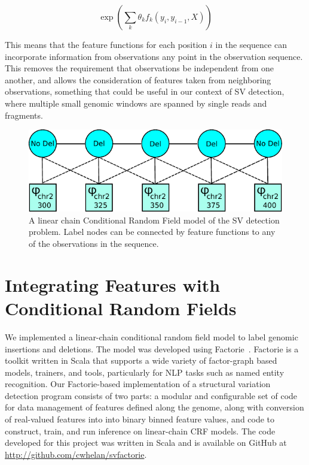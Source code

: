 \[ \exp \left( \sum_k \theta_k f_k(y_i, y_{i-1}, X) \right) \]

This means that the feature functions for each position $i$ in the sequence can incorporate information from observations any point in the observation sequence. This removes the requirement that observations be independent from one another, and allows the consideration of features taken from neighboring observations, something that could be useful in our context of SV detection, where multiple small genomic windows are spanned by single reads and fragments.

\begin{figure}
\centering
\includegraphics[width=.8\textwidth]{figures/graphical-model-2.pdf}
\caption[A linear chain Conditional Random Field model of the SV detection problem.]{A linear chain Conditional Random Field model of the SV detection problem. Label nodes can be connected by feature functions to any of the observations in the sequence.}
\label{graphical_model_crf}
\end{figure}

\section{Integrating Features with Conditional Random Fields}

We implemented a linear-chain conditional random field model to label genomic insertions and deletions. The model was developed using Factorie~\cite{mccallum09:factorie}. Factorie is a toolkit written in Scala that supports a wide variety of factor-graph based models, trainers, and tools, particularly for NLP tasks such as named entity recognition. Our Factorie-based implementation of a structural variation detection program consists of two parts: a modular and configurable set of code for data management of features defined along the genome, along with conversion of real-valued features into into binary binned feature values, and code to construct, train, and run inference on linear-chain CRF models. The code developed for this project was written in Scala and is available on GitHub at \url{http://github.com/cwhelan/svfactorie}. 

